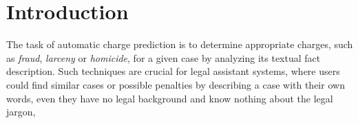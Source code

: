 \section{Introduction}
The task of automatic charge prediction is to determine appropriate charges, 
such as \emph{fraud}, \emph{larceny} or \emph{homicide},  for a given case by analyzing its 
textual fact description.  Such techniques are crucial for legal assistant systems, where
users could find similar cases or possible penalties by describing a case with their own words,
even they have no legal background and 
know nothing about the legal jargon, 




